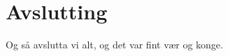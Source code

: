 \section{Avslutting}
\thispagestyle{fancy}
Og så avslutta vi alt, og det var fint vær og konge.

    